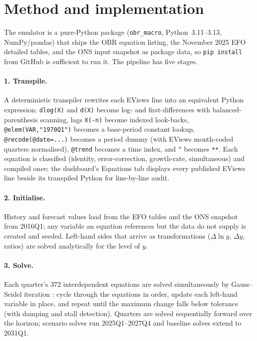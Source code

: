 \section{Method and implementation}
\label{sec:method}

The emulator is a pure-Python package (\texttt{obr\_macro}, Python~3.11--3.13, NumPy/pandas) that ships the OBR equation listing, the November 2025 EFO detailed tables, and the ONS input snapshot as package data, so \texttt{pip install} from GitHub is sufficient to run it. The pipeline has five stages.

\paragraph{1. Transpile.} A deterministic transpiler rewrites each EViews line into an equivalent Python expression: \texttt{dlog(X)} and \texttt{d(X)} become log- and first-differences with balanced-parenthesis scanning, lags \texttt{X(-n)} become indexed look-backs, \texttt{@elem(VAR,"1970Q1")} becomes a base-period constant lookup, \texttt{@recode(@date=...)} becomes a period dummy (with EViews month-coded quarters normalised), \texttt{@trend} becomes a time index, and \texttt{\^{}} becomes \texttt{**}. Each equation is classified (identity, error-correction, growth-rate, simultaneous) and compiled once; the dashboard's Equations tab displays every published EViews line beside its transpiled Python for line-by-line audit.

\paragraph{2. Initialise.} History and forecast values load from the EFO tables and the ONS snapshot from 2016Q1; any variable an equation references but the data do not supply is created and seeded. Left-hand sides that arrive as transformations ($\Delta\ln y$, $\Delta y$, ratios) are solved analytically for the level of $y$.

\paragraph{3. Solve.} Each quarter's 372 interdependent equations are solved simultaneously by Gauss--Seidel iteration \citep{fair2004}: cycle through the equations in order, update each left-hand variable in place, and repeat until the maximum change falls below tolerance (with damping and stall detection). Quarters are solved sequentially forward over the horizon; scenario solves run 2025Q1--2027Q4 and baseline solves extend to 2031Q1.

